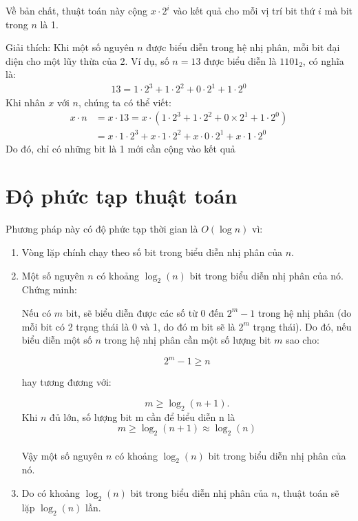 \noindent Về bản chất, thuật toán này cộng $x \cdot 2^i$ vào kết quả cho mỗi vị trí bit thứ $i$ mà bit trong $n$ là 1.

\noindent Giải thích: Khi một số nguyên $n$ được biểu diễn trong hệ nhị phân, mỗi bit đại diện cho một lũy thừa của 2. Ví dụ, số $n=13$ được biểu diễn là $1101_2$, có nghĩa là:
\begin{align*}
13 = 1 \cdot 2^3 + 1 \cdot 2^2 + 0 \cdot 2^1 + 1 \cdot 2^0 
\end{align*}
Khi nhân $x$ với $n$, chúng ta có thể viết: 
\begin{align*}
x \cdot n &= x \cdot 13 = x \cdot (1 \cdot 2^3 + 1 \cdot 2^2 + 0 \times 2^1 + 1 \cdot 2^0) \\
&= x \cdot 1 \cdot 2^3 + x \cdot 1 \cdot 2^2 + x \cdot 0 \cdot 2^1 + x \cdot 1 \cdot 2^0
\end{align*}
\noindent Do đó, chỉ có những bit là 1 mới cần cộng vào kết quả
\section{Độ phức tạp thuật toán}
Phương pháp này có độ phức tạp thời gian là \( O(\log n) \) vì:
\begin{enumerate}
    \item Vòng lặp chính chạy theo số bit trong biểu diễn nhị phân của \( n \).
    \item Một số nguyên \( n \) có khoảng \( \log_2(n) \) bit trong biểu diễn nhị phân của nó. \\
    Chứng minh: 

    Nếu có $m$ bit, sẽ biểu diễn được các số từ $0$ đến $2^m - 1$ trong hệ nhị phân (do mỗi bit có 2 trạng thái là 0 và 1, do đó m bit sẽ là $2^m$ trạng thái). Do đó, nếu biểu diễn một số $n$ trong hệ nhị phân cần một số lượng bit $m$ sao cho:
    
    \[
    2^m - 1 \geq n
    \]
    
    hay tương đương với:
    
    \[
    m \geq \log_2 (n + 1).
    \]
    Khi $n$ đủ lớn, số lượng bit m cần để biểu diễn n là   \[m \geq \log_2 (n + 1) \approx \log_2 (n) \] \\
    Vậy một số nguyên \( n \) có khoảng \( \log_2(n) \) bit trong biểu diễn nhị phân của nó.

    \item Do có khoảng \( \log_2(n) \) bit trong biểu diễn nhị phân của \( n \), thuật toán sẽ lặp \( \log_2(n) \) lần.
    \end{enumerate}